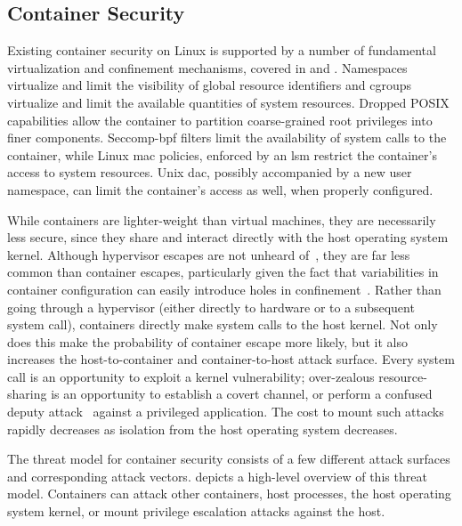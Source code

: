 \subsection{Container Security}%
\label{ss:container-security-bg}

Existing container security on Linux is supported by a number of fundamental
virtualization and confinement mechanisms, covered in  and
. Namespaces virtualize and limit the visibility of global
resource identifiers and cgroups virtualize and limit the available quantities of system
resources. Dropped POSIX capabilities allow the container to partition coarse-grained root
privileges into finer components. Seccomp-bpf filters limit the availability of system
calls to the container, while Linux \gls{mac} policies, enforced by an \gls{lsm} restrict
the container's access to system resources. Unix \gls{dac}, possibly accompanied by a new
user namespace, can limit the container's access as well, when properly configured.

While containers are lighter-weight than virtual machines, they are necessarily less
secure, since they share and interact directly with the host operating system kernel.
Although hypervisor escapes are not unheard of~, they are far less common than
container escapes, particularly given the fact that variabilities in container
configuration can easily introduce holes in
confinement~\cite{sultan2019_container_security}. Rather than going through a hypervisor
(either directly to hardware or to a subsequent system call), containers directly make
system calls to the host kernel. Not only does this make the probability of container
escape more likely, but it also increases the host-to-container and container-to-host
attack surface. Every system call is an opportunity to exploit a kernel vulnerability;
over-zealous resource-sharing is an opportunity to establish a covert channel, or perform
a confused deputy attack~\cite{hardy1988_confused_deputy} against a privileged
application. The cost to mount such attacks rapidly decreases as isolation from the host
operating system decreases.

The threat model for container security consists of a few different attack surfaces and
corresponding attack vectors.  depicts a high-level overview of
this threat model. Containers can attack other containers, host processes, the host
operating system kernel, or mount privilege escalation attacks against the host.

